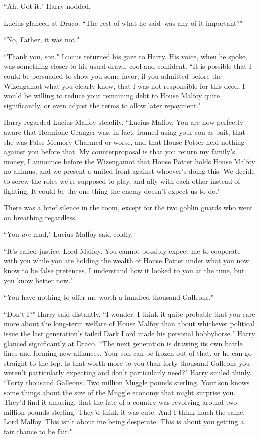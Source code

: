 ``Ah. Got it." Harry nodded.

Lucius glanced at Draco. ``The rest of what he said\---was any of it important?"

``No, Father, it was not."

``Thank you, son." Lucius returned his gaze to Harry. His voice, when he spoke, was something closer to his usual drawl, cool and confident. ``It is possible that I could be persuaded to show you some favor, if you admitted before the Wizengamot what you clearly know, that I was not responsible for this deed. I would be willing to reduce your remaining debt to House Malfoy quite significantly, or even adjust the terms to allow later repayment."

Harry regarded Lucius Malfoy steadily. ``Lucius Malfoy. You are now perfectly aware that Hermione Granger was, in fact, framed using your son as bait, that she was False-Memory-Charmed or worse, and that House Potter held nothing against you before that. My counterproposal is that you return my family's money, I announce before the Wizengamot that House Potter holds House Malfoy no animus, and we present a united front against whoever's doing this. We decide to screw the roles we're supposed to play, and ally with each other instead of fighting. It could be the one thing the enemy doesn't expect us to do."

There was a brief silence in the room, except for the two goblin guards who went on breathing regardless.

``You \emph{are} mad," Lucius Malfoy said coldly.

``It's called justice, Lord Malfoy. You cannot possibly expect me to cooperate with you while you are holding the wealth of House Potter under what you now know to be false pretences. I understand how it looked to you at the time, but you know better now."

``You have nothing to offer me worth a hundred thousand Galleons."

``Don't I?" Harry said distantly. ``I wonder. I think it quite probable that you care more about the long-term welfare of House Malfoy than about whichever political issue the last generation's failed Dark Lord made his personal hobbyhorse." Harry glanced significantly at Draco. ``The next generation is drawing its own battle lines and forming new alliances. Your son can be frozen out of that, or he can go straight to the top. Is that worth more to you than forty thousand Galleons you weren't particularly expecting and don't particularly need?" Harry smiled thinly. ``Forty thousand Galleons. Two million Muggle pounds sterling. Your son knows some things about the size of the Muggle economy that might surprise you. They'd find it amusing, that the fate of a country was revolving around two million pounds sterling. They'd think it was cute. And I think much the same, Lord Malfoy. This isn't about me being desperate. This is about you getting a fair chance to be fair."

